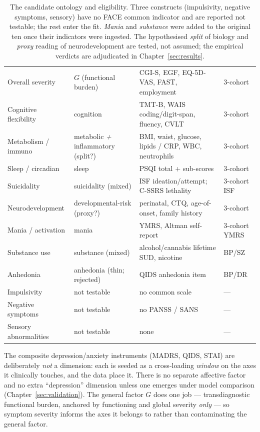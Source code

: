 \begin{table}[h]\centering\small\sffamily
\caption{The candidate ontology and eligibility. Three constructs (impulsivity, negative symptoms, sensory) have
no FACE common indicator and are reported not testable; the rest enter the fit. \emph{Mania} and
\emph{substance} were added to the original ten once their indicators were ingested. The hypothesised
\emph{split} of biology and \emph{proxy} reading of neurodevelopment are tested, not assumed; the empirical
verdicts are adjudicated in Chapter~\ref{sec:results}.}
\label{tab:candidates}
\begin{tabular}{L{3.7cm} L{3.5cm} L{5.0cm} C{1.6cm}}
\toprule
{} &  &  & \\
\midrule
{} Overall severity & $G$ (functional burden) & CGI-S, EGF, EQ-5D-VAS, FAST, employment & 3-cohort\\
Cognitive flexibility & cognition & TMT-B, WAIS coding/digit-span, fluency, CVLT & 3-cohort\\
 Metabolism / immuno & metabolic \emph{+} inflammatory (split?) & BMI, waist, glucose, lipids / CRP, WBC, neutrophils & 3-cohort\\
Sleep / circadian & sleep & PSQI total + sub-scores & 3-cohort\\
 Suicidality & suicidality (mixed) & ISF ideation/attempt; C-SSRS lethality & 3-cohort ISF\\
Neurodevelopment & developmental-risk (proxy?) & perinatal, CTQ, age-of-onset, family history & 3-cohort\\
 Mania / activation & mania & YMRS, Altman self-report & 3-cohort YMRS\\
Substance use & substance (mixed) & alcohol/cannabis lifetime SUD, nicotine & BP/SZ\\
 Anhedonia & anhedonia (thin; rejected) & QIDS anhedonia item & BP/DR\\
Impulsivity & not testable & no common scale & ---\\
 Negative symptoms & not testable & no PANSS / SANS & ---\\
Sensory abnormalities & not testable & none & ---\\
\bottomrule
\end{tabular}
\end{table}

The composite depression/anxiety instruments (MADRS, QIDS, STAI) are deliberately \emph{not} a dimension: each
is seeded as a cross-loading \emph{window} on the axes it clinically touches, and the data place it. There is no
separate affective factor and no extra ``depression'' dimension unless one emerges under model comparison
(Chapter~\ref{sec:validation}). The general factor $G$ does one job --- transdiagnostic functional burden,
anchored by functioning and global severity \emph{only} --- so symptom severity informs the axes it belongs to
rather than contaminating the general factor.

